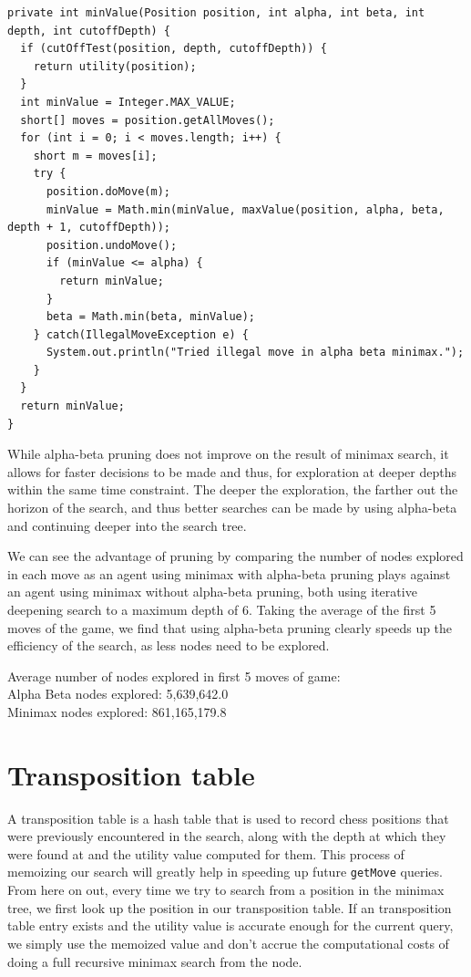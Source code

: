 \documentclass{article}
\begin{document}
\begin{lstlisting}
private int minValue(Position position, int alpha, int beta, int depth, int cutoffDepth) {
  if (cutOffTest(position, depth, cutoffDepth)) {
    return utility(position);
  }
  int minValue = Integer.MAX_VALUE;
  short[] moves = position.getAllMoves();
  for (int i = 0; i < moves.length; i++) {
    short m = moves[i];
    try {
      position.doMove(m);
      minValue = Math.min(minValue, maxValue(position, alpha, beta, depth + 1, cutoffDepth));
      position.undoMove();
      if (minValue <= alpha) {
        return minValue; 
      }
      beta = Math.min(beta, minValue);
    } catch(IllegalMoveException e) {
      System.out.println("Tried illegal move in alpha beta minimax.");
    }
  }
  return minValue;
}
\end{lstlisting}

While alpha-beta pruning does not improve on the result of minimax search, it allows for faster decisions to be made and thus, for exploration at deeper depths within the same time constraint. The deeper the exploration, the farther out the horizon of the search, and thus better searches can be made by using alpha-beta and continuing deeper into the search tree.

We can see the advantage of pruning by comparing the number of nodes explored in each move as an agent using minimax with alpha-beta pruning plays against an agent using minimax without alpha-beta pruning, both using iterative deepening search to a maximum depth of 6. Taking the average of the first 5 moves of the game, we find that using alpha-beta pruning clearly speeds up the efficiency of the search, as less nodes need to be explored.

\vspace{5mm}

{\setlength{\parindent}{0cm}
Average number of nodes explored in first 5 moves of game:\\
Alpha Beta nodes explored: 5,639,642.0\\
Minimax nodes explored: 861,165,179.8}

\section{Transposition table}

A transposition table is a hash table that is used to record chess positions that were previously encountered in the search, along with the depth at which they were found at and the utility value computed for them. This process of memoizing our search will greatly help in speeding up future \verb`getMove` queries. From here on out, every time we try to search from a position in the minimax tree, we first look up the position in our transposition table. If an transposition table entry exists and the utility value is accurate enough for the current query, we simply use the memoized value and don't accrue the computational costs of doing a full recursive minimax search from the node. 
\end{document}
